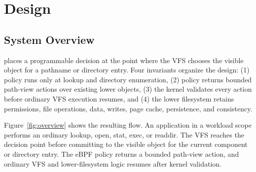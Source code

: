 \section{Design}
\label{sec:design}

\subsection{System Overview}

\namei places a programmable decision at the point where the VFS chooses the
visible object for a pathname or directory entry. Four invariants organize the
design: (1) policy runs only at lookup and directory enumeration, (2) policy
returns bounded path-view actions over existing lower objects, (3) the kernel
validates every action before ordinary VFS execution resumes, and (4) the lower
filesystem retains permissions, file operations, data, writes, page cache,
persistence, and consistency.

Figure~\ref{fig:overview} shows the resulting flow. An application in a
workload scope performs an ordinary lookup, open, stat, exec, or readdir. The
VFS reaches the \namei decision point before committing to the visible object
for the current component or directory entry. The eBPF policy returns a bounded
path-view action, and ordinary VFS and lower-filesystem logic resumes after
kernel validation.

